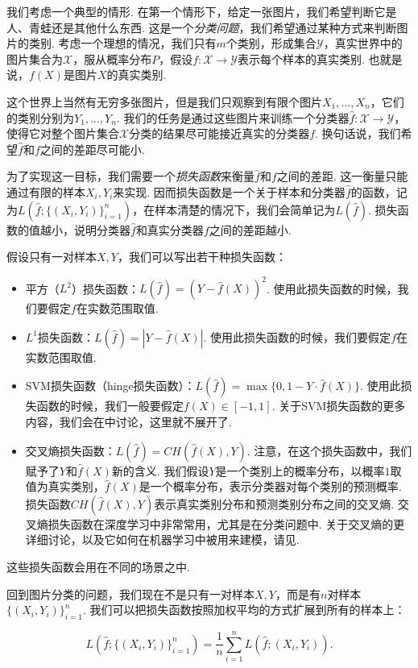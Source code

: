 我们考虑一个典型的情形. 在第一个情形下，给定一张图片，我们希望判断它是人、青蛙还是其他什么东西. 这是一个\textit{分类问题}，我们希望通过某种方式来判断图片的类别. 考虑一个理想的情况，我们只有$m$个类别，形成集合$\mathcal Y$，真实世界中的图片集合为$\mathcal X$，服从概率分布$P$，假设$f:\mathcal X\to\mathcal Y$表示每个样本的真实类别. 也就是说，$f(X)$是图片$X$的真实类别.

这个世界上当然有无穷多张图片，但是我们只观察到有限个图片$X_1,\dots,X_n$，它们的类别分别为$Y_1,\dots,Y_n$. 我们的任务是通过这些图片来训练一个分类器$\hat f:\mathcal X\to\mathcal Y$，使得它对整个图片集合$\mathcal X$分类的结果尽可能接近真实的分类器$f$. 换句话说，我们希望$\hat f$和$f$之间的差距尽可能小.

为了实现这一目标，我们需要一个\textit{损失函数}来衡量$\hat f$和$f$之间的差距. 这一衡量只能通过有限的样本$X_i,Y_i$来实现. 因而损失函数是一个关于样本和分类器$\hat f$的函数，记为$L(\hat{f};\{(X_i,Y_i)\}_{i=1}^n)$，在样本清楚的情况下，我们会简单记为$L(\hat{f})$. 损失函数的值越小，说明分类器$\hat f$和真实分类器$f$之间的差距越小. 

假设只有一对样本$X,Y$，我们可以写出若干种损失函数：
\begin{itemize}
    \item 平方（$L^2$）损失函数：$L(\hat{f})=(Y-\hat f(X))^2$. 使用此损失函数的时候，我们要假定$f$在实数范围取值. 
    \item $L^1$损失函数：$L(\hat{f})=|Y-\hat f(X)|$. 使用此损失函数的时候，我们要假定$f$在实数范围取值. 
    \item SVM损失函数（hinge损失函数）：$L(\hat{f})=\max\{0,1-Y\cdot\hat f(X)\}$. 使用此损失函数的时候，我们一般要假定$f(X)\in[-1,1]$. 关于SVM损失函数的更多内容，我们会在中讨论，这里就不展开了. 
    \item 交叉熵损失函数：$L(\hat{f})=CH(\hat f(X),Y)$. 注意，在这个损失函数中，我们赋予了$Y$和$\hat f(X)$新的含义. 我们假设$Y$是一个类别上的概率分布，以概率$1$取值为真实类别，$\hat f(X)$是一个概率分布，表示分类器对每个类别的预测概率. 损失函数$CH(\hat f(X),Y)$表示真实类别分布和预测类别分布之间的交叉熵. 交叉熵损失函数在深度学习中非常常用，尤其是在分类问题中. 关于交叉熵的更详细讨论，以及它如何在机器学习中被用来建模，请见.
\end{itemize}
这些损失函数会用在不同的场景之中. 

回到图片分类的问题，我们现在不是只有一对样本$X,Y$，而是有$n$对样本$\{(X_i,Y_i)\}_{i=1}^n$. 我们可以把损失函数按照加权平均的方式扩展到所有的样本上：

\[L(\hat f;\{(X_i,Y_i)\}_{i=1}^n)=\frac{1}{n}\sum_{i=1}^n L(\hat f;(X_i,Y_i)).\]


